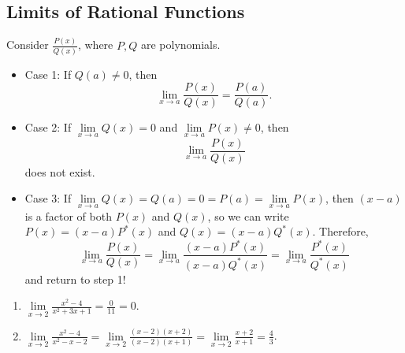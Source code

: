 \subsection*{Limits of Rational Functions}
Consider $ \frac{P(x)}{Q(x)} $, where $ P,Q $ are polynomials.
\begin{itemize}
    \item Case 1: If $ Q(a)\ne 0 $, then
          \[ \lim\limits_{{x} \to {a}}\frac{P(x)}{Q(x)}=\frac{P(a)}{Q(a)}. \]
    \item Case 2: If $ \lim\limits_{{x} \to {a}}Q(x)=0 $ and $ \lim\limits_{{x} \to {a}}P(x)\ne 0 $, then
          \[ \lim\limits_{{x} \to {a}}\frac{P(x)}{Q(x)} \]
          does not exist.
    \item Case 3: If $ \lim\limits_{{x} \to {a}}Q(x)=Q(a)=0=P(a)=\lim\limits_{{x} \to {a}}P(x) $, then
          $ (x-a) $ is a factor of both $ P(x) $ and $ Q(x) $, so we can write
          $ P(x)=(x-a)P^*(x) $ and $ Q(x)=(x-a)Q^*(x) $. Therefore,
          \[ \lim\limits_{{x} \to {a}}\frac{P(x)}{Q(x)}=\lim\limits_{{x} \to {a}}\frac{(x-a)P^*(x)}{(x-a)Q^*(x)}
              =\lim\limits_{{x} \to {a}}\frac{P^*(x)}{Q^*(x)} \]
          and return to step 1!
\end{itemize}
\begin{Example}{}{}
    \begin{enumerate}[(1)]
        \item $ \displaystyle \lim\limits_{{x} \to {2}}\frac{x^2-4}{x^2+3x+1}=\frac{0}{11}=0 $.
        \item $ \displaystyle \lim\limits_{{x} \to {2}}\frac{x^2-4}{x^2-x-2}=\lim\limits_{{x} \to {2}}\frac{(x-2)(x+2)}{(x-2)(x+1)}
                  =\lim\limits_{{x} \to {2}}\frac{x+2}{x+1}=\frac{4}{3} $.
    \end{enumerate}
\end{Example}

